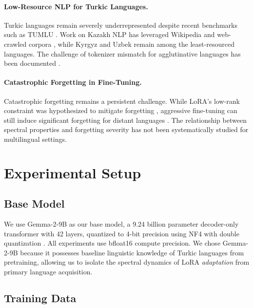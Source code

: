 \documentclass[11pt]{article}
\begin{document}
\paragraph{Low-Resource NLP for Turkic Languages.}
Turkic languages remain severely underrepresented despite recent benchmarks such as TUMLU \cite{isbarov2024tumlu}. Work on Kazakh NLP has leveraged Wikipedia and web-crawled corpora \cite{yeshpanov2024kazllm}, while Kyrgyz and Uzbek remain among the least-resourced languages. The challenge of tokenizer mismatch for agglutinative languages has been documented \cite{rust2021good,ahia2023all}.

\paragraph{Catastrophic Forgetting in Fine-Tuning.}
Catastrophic forgetting \cite{mccloskey1989catastrophic,kirkpatrick2017overcoming} remains a persistent challenge. While LoRA's low-rank constraint was hypothesized to mitigate forgetting \cite{biderman2024lora}, aggressive fine-tuning can still induce significant forgetting for distant languages \cite{csaki2024sambalingo}. The relationship between spectral properties and forgetting severity has not been systematically studied for multilingual settings.

\section{Experimental Setup}

\subsection{Base Model}

We use Gemma-2-9B \cite{team2024gemma} as our base model, a 9.24 billion parameter decoder-only transformer with 42 layers, quantized to 4-bit precision using NF4 with double quantization \cite{dettmers2023qlora}. All experiments use bfloat16 compute precision. We chose Gemma-2-9B because it possesses baseline linguistic knowledge of Turkic languages from pretraining, allowing us to isolate the spectral dynamics of LoRA \emph{adaptation} from primary language acquisition.

\subsection{Training Data}
\label{sec:data}
\end{document}
